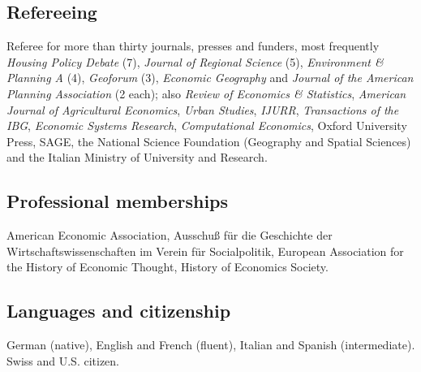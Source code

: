 \documentclass[letter,11pt]{article}
\begin{document}
\subsection*{Refereeing}
\noindent Referee for more than thirty journals, presses and funders, most frequently \emph{Housing Policy Debate} (7), \emph{Journal of Regional Science} (5), \emph{Environment \& Planning A} (4), \emph{Geoforum} (3), \emph{Economic Geography} and \emph{Journal of the American Planning Association} (2 each); also \emph{Review of Economics \& Statistics}, \emph{American Journal of Agricultural Economics}, \emph{Urban Studies}, \emph{IJURR}, \emph{Transactions of the IBG}, \emph{Economic Systems Research}, \emph{Computational Economics}, Oxford University Press, SAGE, the National Science Foundation (Geography and Spatial Sciences) and the Italian Ministry of University and Research.

\subsection*{Professional memberships}
\noindent American Economic Association, Ausschu{\ss} f\"{u}r die Geschichte der Wirtschaftswissenschaften im Verein f\"{u}r Socialpolitik, European Association for the History of Economic Thought, History of Economics Society.

\subsection*{Languages and citizenship}
\noindent German (native), English and French (fluent), Italian and Spanish (intermediate). Swiss and U.S. citizen.
\end{document}
